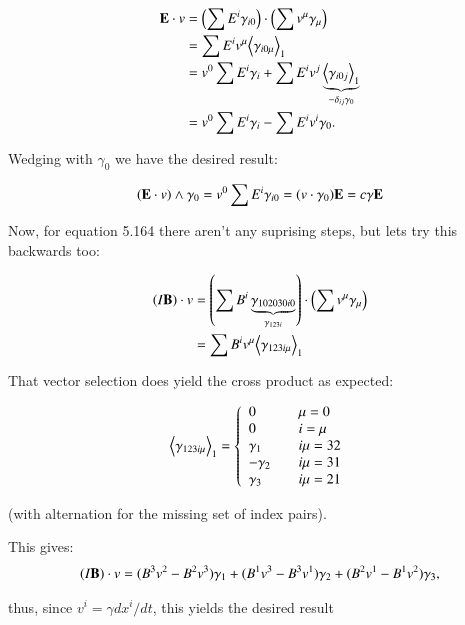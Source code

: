 \documentclass{article}
\newcommand{\gpgrade}[2] {{\left\langle{{#1}}\right\rangle}_{#2}}
\newcommand{\gpgradeone}[1] {\gpgrade{#1}{1}}
\begin{document}
\begin{align*}
\BE \cdot v
&= \left(\sum E^i \gamma_{i0}\right) \cdot \left( \sum v^{\mu} \gamma_{\mu}\right) \\
&= \sum E^i v^{\mu} \gpgradeone{ \gamma_{i0\mu}} \\
&= v^0 \sum E^i \gamma_{i} + \sum E^i v^{j} \underbrace{\gpgradeone{ \gamma_{i0j}}}_{-\delta_{ij} \gamma_0} \\
&= v^0 \sum E^i \gamma_i - \sum E^i v^i \gamma_0.
\end{align*}

Wedging with $\gamma_0$ we have the desired result:

\begin{equation*}
(\mathbf{E} \cdot v) \wedge \gamma_0 = v^0 \sum E^i \gamma_{i0} = (v \cdot \gamma_0) \mathbf{E} = c \gamma \mathbf{E}
\end{equation*}

Now, for equation 5.164 there aren't any suprising steps, but lets try this backwards too:

\begin{align*}
(I \BB) \cdot v
&= \left(\sum B^i \underbrace{\gamma_{102030i0}}_{\gamma_{123i}} \right) \cdot \left( \sum v^{\mu} \gamma_{\mu} \right) \\
&= \sum B^i v^{\mu} \gpgradeone{\gamma_{123i\mu}}
\end{align*}

That vector selection does yield the cross product as expected:

\begin{equation*}
\gpgradeone{\gamma_{123i\mu}} =
\left\{ 
\begin{array}{l l}
0 & \quad \mu = 0 \\
0 & \quad i = \mu \\
\gamma_1 & \quad i\mu = 32 \\
-\gamma_2 & \quad i\mu = 31 \\
\gamma_3 & \quad i\mu = 21 \\
\end{array} \right.
\end{equation*}

(with alternation for the missing set of index pairs).

This gives:
\begin{align*}
(I \mathbf{B}) \cdot v
= (B^3 v^2 - B^2 v^3) \gamma_1
+ (B^1 v^3 - B^3 v^1) \gamma_2
+ (B^2 v^1 - B^1 v^2) \gamma_3,
\end{align*}

thus, since $v^i = \gamma d{x^i}/dt$, this yields the desired result
\end{document}
